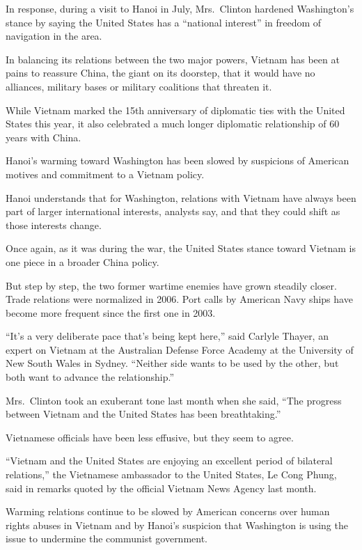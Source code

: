 ﻿\documentclass[12pt]{article}
\begin{document}
In response, during a visit to Hanoi in July, Mrs.~Clinton hardened Washington's stance by saying
the United States has a ``national interest'' in freedom of navigation in the area.

In balancing its relations between the two major powers, Vietnam has been at pains to reassure
China, the giant on its doorstep, that it would have no alliances, military bases or military
coalitions that threaten it.

While Vietnam marked the 15th anniversary of diplomatic ties with the United States this year, it
also celebrated a much longer diplomatic relationship of 60 years with China.

Hanoi's warming toward Washington has been slowed by suspicions of American motives and commitment
to a Vietnam policy.

Hanoi understands that for Washington, relations with Vietnam have always been part of larger
international interests, analysts say, and that they could shift as those interests change.

Once again, as it was during the war, the United States stance toward Vietnam is one piece in a
broader China policy.

But step by step, the two former wartime enemies have grown steadily closer. Trade relations were
normalized in 2006. Port calls by American Navy ships have become more frequent since the first one
in 2003.

``It's a very deliberate pace that's being kept here,'' said Carlyle Thayer, an expert on Vietnam at
the Australian Defense Force Academy at the University of New South Wales in Sydney. ``Neither side
wants to be used by the other, but both want to advance the relationship.''

Mrs.~Clinton took an exuberant tone last month when she said, ``The progress between Vietnam and the
United States has been breathtaking.''

Vietnamese officials have been less effusive, but they seem to agree.

``Vietnam and the United States are enjoying an excellent period of bilateral relations,'' the
Vietnamese ambassador to the United States, Le Cong Phung, said in remarks quoted by the official
Vietnam News Agency last month.

Warming relations continue to be slowed by American concerns over human rights abuses in Vietnam and
by Hanoi's suspicion that Washington is using the issue to undermine the communist government.
\end{document}
